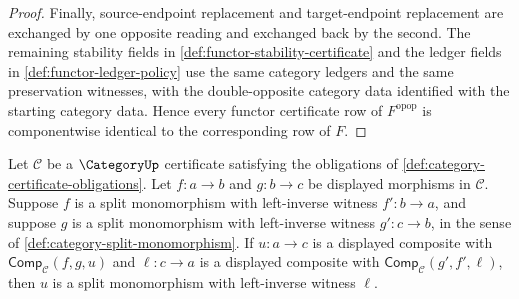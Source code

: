 \begin{proof}
Finally, source-endpoint replacement and target-endpoint replacement are exchanged by one opposite reading and exchanged back by the second. The remaining stability fields in \autoref{def:functor-stability-certificate} and the ledger fields in \autoref{def:functor-ledger-policy} use the same category ledgers and the same preservation witnesses, with the double-opposite category data identified with the starting category data. Hence every functor certificate row of $F^{\mathrm{opop}}$ is componentwise identical to the corresponding row of $F$.
\end{proof}

\begin{theorem}
\label{thm:category-split-monomorphism-composition-closed}
Let $\mathcal C$ be a $\CategoryUp$ certificate satisfying the obligations of
\autoref{def:category-certificate-obligations}. Let $f:a\to b$ and
$g:b\to c$ be displayed morphisms in $\mathcal C$. Suppose $f$ is a split
monomorphism with left-inverse witness $f':b\to a$, and suppose $g$ is a
split monomorphism with left-inverse witness $g':c\to b$, in the sense of
\autoref{def:category-split-monomorphism}. If $u:a\to c$ is a displayed
composite with $\mathsf{Comp}_{\mathcal C}(f,g,u)$ and $\ell:c\to a$ is a
displayed composite with $\mathsf{Comp}_{\mathcal C}(g',f',\ell)$, then $u$
is a split monomorphism with left-inverse witness $\ell$.
\end{theorem}
